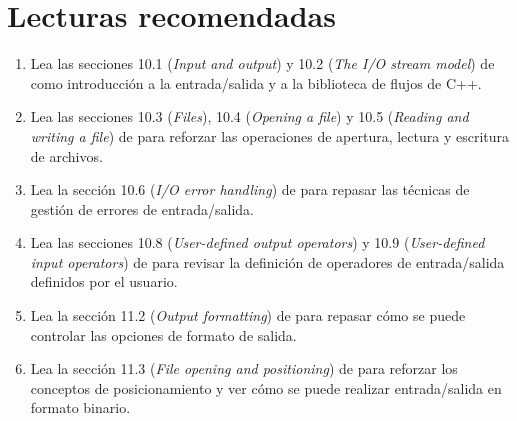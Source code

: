 \section{Lecturas recomendadas}

\begin{enumerate}

\item Lea las secciones 
      10.1 (\emph{Input and output}) y 10.2 (\emph{The I/O stream model})
      de \pppbook{}
      como introducción a la entrada/salida y a la biblioteca de flujos de C++.

\item Lea las secciones 10.3 (\emph{Files}), 10.4 (\emph{Opening a file}) y
      10.5 (\emph{Reading and writing a file})
      de \pppbook{}
      para reforzar las operaciones de apertura, lectura y escritura
      de archivos.

\item Lea la sección 10.6 (\emph{I/O error handling})
      de \pppbook{}
      para repasar las técnicas de gestión de errores de entrada/salida.

\item Lea las secciones 10.8 (\emph{User-defined output operators}) y
      10.9 (\emph{User-defined input operators})
      de \pppbook{}
      para revisar la definición de operadores de entrada/salida definidos
      por el usuario.

\item Lea la sección 11.2 (\emph{Output formatting}) 
      de \pppbook{}
      para repasar cómo se puede controlar las opciones de formato de salida.

\item Lea la sección 11.3 (\emph{File opening and positioning})
      de \pppbook{}
      para reforzar los conceptos de posicionamiento y ver
      cómo se puede realizar entrada/salida en formato binario.

\end{enumerate}
